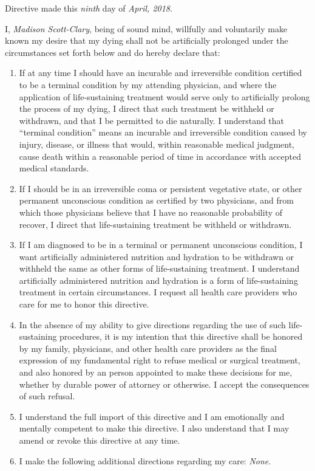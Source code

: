 \documentclass[oneside]{memoir}
\begin{document}
Directive made this \emph{ninth} day of \emph{April, 2018}.

I, \emph{Madison Scott-Clary}, being of sound mind, willfully and voluntarily make known my desire that my dying shall not be artificially prolonged under the circumstances set forth below and do hereby declare that:

\begin{enumerate}
\def\labelenumi{\arabic{enumi}.}
\tightlist
\item
  If at any time I should have an incurable and irreversible condition certified to be a terminal condition by my attending physician, and where the application of life-sustaining treatment would serve only to artificially prolong the process of my dying, I direct that such treatment be withheld or withdrawn, and that I be permitted to die naturally. I understand that ``terminal condition'' means an incurable and irreversible condition caused by injury, disease, or illness that would, within reasonable medical judgment, cause death within a reasonable period of time in accordance with accepted medical standards.
\item
  If I should be in an irreversible coma or persistent vegetative state, or other permanent unconscious condition as certified by two physicians, and from which those physicians believe that I have no reasonable probability of recover, I direct that life-sustaining treatment be withheld or withdrawn.
\item
  If I am diagnosed to be in a terminal or permanent unconscious condition, I want artificially administered nutrition and hydration to be withdrawn or withheld the same as other forms of life-sustaining treatment. I understand artificially administered nutrition and hydration is a form of life-sustaining treatment in certain circumstances. I request all health care providers who care for me to honor this directive.
\item
  In the absence of my ability to give directions regarding the use of such life-sustaining procedures, it is my intention that this directive shall be honored by my family, physicians, and other health care providers as the final expression of my fundamental right to refuse medical or surgical treatment, and also honored by an person appointed to make these decisions for me, whether by durable power of attorney or otherwise. I accept the consequences of such refusal.
\item
  I understand the full import of this directive and I am emotionally and mentally competent to make this directive. I also understand that I may amend or revoke this directive at any time.
\item
  I make the following additional directions regarding my care: \emph{None}.
\end{enumerate}
\end{document}
